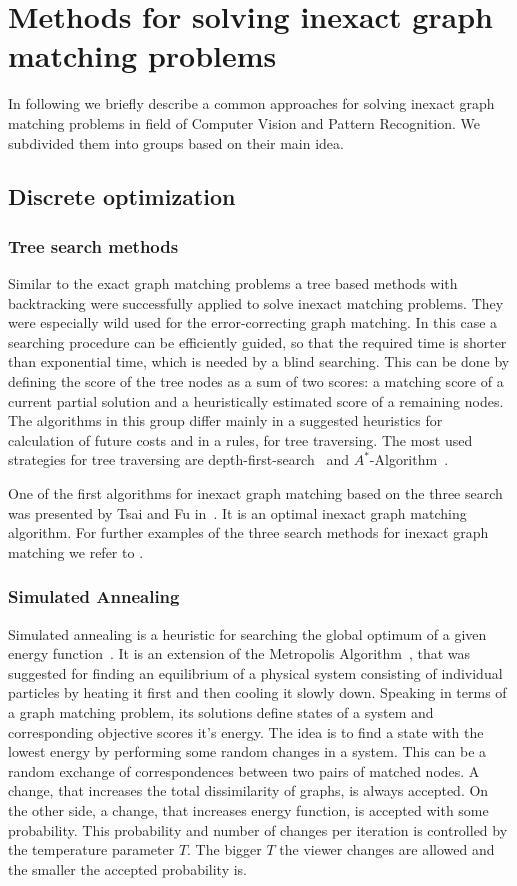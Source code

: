 \section{Methods for solving inexact graph matching problems}
In following we briefly describe a common approaches for solving inexact graph matching problems in field of Computer Vision and Pattern Recognition. We subdivided them into groups based on their main idea.
\subsection{Discrete optimization}
\subsubsection{Tree search methods}
Similar to the exact graph matching problems a tree based methods with backtracking were successfully applied to solve inexact matching problems. They were especially wild used for the error-correcting graph matching. In this case a searching procedure can be efficiently guided, so that the required time is shorter than exponential time, which is needed by a blind searching. This can be done by defining the score of the tree nodes as a sum of two scores: a matching score of a current partial solution and a heuristically estimated score of a remaining nodes. The algorithms in this group differ mainly in a suggested heuristics for calculation of future costs and in a rules, for tree traversing. The most used strategies for tree traversing are depth-first-search~\cite{Cormen} and $A^*$-Algorithm~\cite{AStar}.

One of the first algorithms for inexact graph matching based on the three search was presented by Tsai and Fu in~\cite{Fu1979}. It is an optimal inexact graph matching algorithm. For further examples of the three search methods for inexact graph matching we refer to \cite{Bunke1983_inexactGM,Shapiro1981,Wang1995}.
\subsubsection{Simulated Annealing}
Simulated annealing is a heuristic for searching the global optimum of a given energy function~\cite{Burkard98thequadratic}. It is an extension of the Metropolis Algorithm~\cite{Metropolis}, that was suggested for finding an equilibrium of a physical system consisting of individual particles by heating it first and then cooling it slowly down. Speaking in terms of a graph matching problem, its solutions define states of a system and corresponding objective scores it's energy. The idea is to find a state with the lowest energy by performing some random changes in a system. This can be a random exchange of correspondences between two pairs of matched nodes. A change, that increases the total dissimilarity of graphs, is always accepted. On the other side, a change, that increases energy function, is accepted with some probability. This probability and number of changes per iteration is controlled by the temperature parameter $T$. The bigger $T$ the viewer changes are allowed and the smaller the accepted probability is. 

